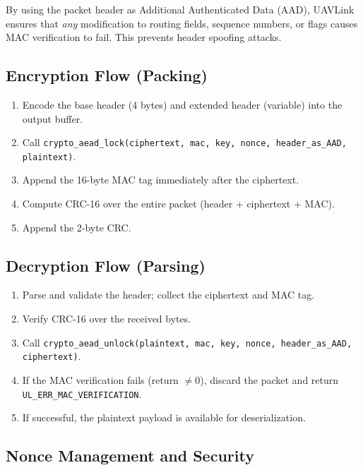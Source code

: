 \documentclass[11pt,a4paper]{article}
\begin{document}
\begin{notebox}
By using the packet header as Additional Authenticated Data (AAD), UAVLink ensures that \emph{any} modification to routing fields, sequence numbers, or flags causes MAC verification to fail. This prevents header spoofing attacks.
\end{notebox}

\subsection{Encryption Flow (Packing)}

\begin{enumerate}[noitemsep]
    \item Encode the base header (4 bytes) and extended header (variable) into the output buffer.
    \item Call \texttt{crypto\_aead\_lock(ciphertext, mac, key, nonce, header\_as\_AAD, plaintext)}.
    \item Append the 16-byte MAC tag immediately after the ciphertext.
    \item Compute CRC-16 over the entire packet (header + ciphertext + MAC).
    \item Append the 2-byte CRC.
\end{enumerate}

\subsection{Decryption Flow (Parsing)}

\begin{enumerate}[noitemsep]
    \item Parse and validate the header; collect the ciphertext and MAC tag.
    \item Verify CRC-16 over the received bytes.
    \item Call \texttt{crypto\_aead\_unlock(plaintext, mac, key, nonce, header\_as\_AAD, ciphertext)}.
    \item If the MAC verification fails (return $\neq 0$), discard the packet and return \texttt{UL\_ERR\_MAC\_VERIFICATION}.
    \item If successful, the plaintext payload is available for deserialization.
\end{enumerate}

\subsection{Nonce Management and Security}
\end{document}
